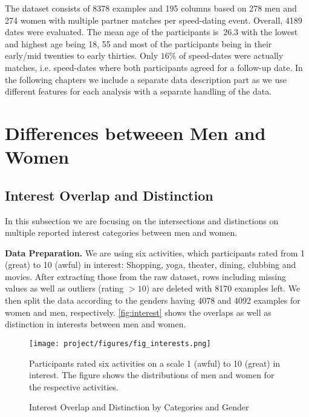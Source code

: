 \documentclass{article}
\begin{document}
The dataset consists of 8378 examples and 195 columns based on 278 men and 274 women with multiple partner matches per speed-dating event. Overall, 4189 dates were evaluated. The mean age of the participants is $~26.3$ with the lowest and highest age being 18, 55 and most of the participants being in their early/mid twenties to early thirties. Only $16\%$ of speed-dates were actually matches, i.e. speed-dates where both participants agreed for a follow-up date. In the following chapters we include a separate data description part as we use different features for each analysis with a separate handling of the data.

\section{Differences betweeen Men and Women}
\subsection{Interest Overlap and Distinction}
In this subsection we are focusing on the intersections and distinctions on multiple reported interest categories between men and women. 

\textbf{Data Preparation.} We are using six activities, which participants rated from 1 (great) to 10 (awful) in interest: Shopping, yoga, theater, dining, clubbing and movies. 
After extracting those from the raw dataset, rows including missing values as well as outliers (rating $>10$) are deleted with 8170 examples left.
We then split the data according to the genders having 4078 and 4092 examples for women and men, respectively.
\autoref{fig:interest} shows the overlaps as well as distinction in interests between men and women.

\begin{figure}[ht]
\centering
\texttt{[image: project/figures/fig\_interests.png]}
\caption{Interest Overlap and Distinction by Categories and Gender}
\label{fig:interest}
\small Participants rated six activities on a scale 1 (awful) to 10 (great) in interest. The figure shows the distributions of men and women for the respective activities.  
\end{figure}
\end{document}
